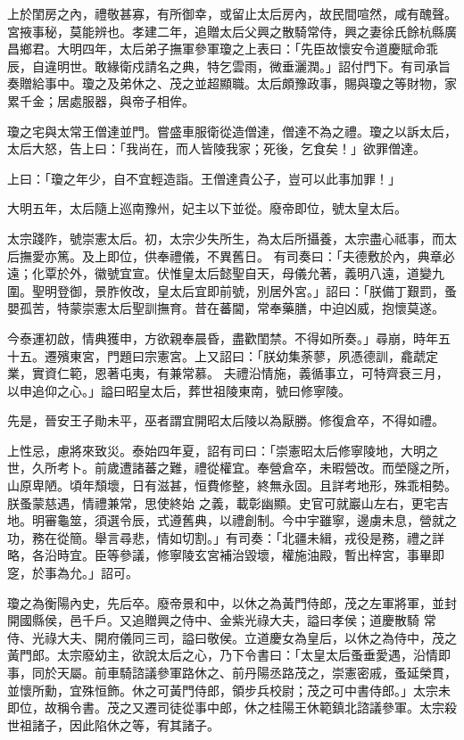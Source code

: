 \begin{pinyinscope}
 上於閨房之內，禮敬甚寡，有所御幸，或留止太后房內，故民間喧然，咸有醜聲。宮掖事秘，莫能辨也。孝建二年，追贈太后父興之散騎常侍，興之妻徐氏餘杭縣廣昌鄉君。大明四年，太后弟子撫軍參軍瓊之上表曰：「先臣故懷安令道慶賦命乖辰，自違明世。敢緣衛戍請名之典，特乞雲雨，微垂灑潤。」詔付門下。有司承旨奏贈給事中。瓊之及弟休之、茂之並超顯職。太后頗豫政事，賜與瓊之等財物，家
 累千金；居處服器，與帝子相侔。



 瓊之宅與太常王僧達並門。嘗盛車服衛從造僧達，僧達不為之禮。瓊之以訴太后，太后大怒，告上曰：「我尚在，而人皆陵我家；死後，乞食矣！」欲罪僧達。



 上曰：「瓊之年少，自不宜輕造詣。王僧達貴公子，豈可以此事加罪！」



 大明五年，太后隨上巡南豫州，妃主以下並從。廢帝即位，號太皇太后。



 太宗踐阼，號崇憲太后。初，太宗少失所生，為太后所攝養，太宗盡心祗事，而太后撫愛亦篤。及上即位，供奉禮儀，不異舊日。
 有司奏曰：「夫德敷於內，典章必遠；化覃於外，徽號宜宣。伏惟皇太后懿聖自天，母儀允著，義明八遠，道變九圍。聖明登御，景胙攸改，皇太后宜即前號，別居外宮。」詔曰：「朕備丁艱罰，蚤嬰孤苦，特蒙崇憲太后聖訓撫育。昔在蕃閫，常奉藥膳，中迫凶威，抱懷莫遂。



 今泰運初啟，情典獲申，方欲親奉晨昏，盡歡閨禁。不得如所奏。」尋崩，時年五十五。遷殯東宮，門題曰宗憲宮。上又詔曰：「朕幼集荼蓼，夙憑德訓，龕虣定業，實資仁範，恩著屯夷，有兼常慕。
 夫禮沿情施，義循事立，可特齊衰三月，以申追仰之心。」謚曰昭皇太后，葬世祖陵東南，號曰修寧陵。



 先是，晉安王子勛未平，巫者謂宜開昭太后陵以為厭勝。修復倉卒，不得如禮。



 上性忌，慮將來致災。泰始四年夏，詔有司曰：「崇憲昭太后修寧陵地，大明之世，久所考卜。前歲遭諸蕃之難，禮從權宜。奉營倉卒，未暇營改。而塋隧之所，山原卑陋。頃年頹壞，日有滋甚，恒費修整，終無永固。且詳考地形，殊乖相勢。朕蚤蒙慈遇，情禮兼常，思使終始
 之義，載彰幽顯。史官可就巖山左右，更宅吉地。明審龜筮，須選令辰，式遵舊典，以禮創制。今中宇雖寧，邊虜未息，營就之功，務在從簡。舉言尋悲，情如切割。」有司奏：「北疆未緝，戎役是務，禮之詳略，各沿時宜。臣等參議，修寧陵玄宮補治毀壞，權施油殿，暫出梓宮，事畢即窆，於事為允。」詔可。



 瓊之為衡陽內史，先后卒。廢帝景和中，以休之為黃門侍郎，茂之左軍將軍，並封開國縣侯，邑千戶。又追贈興之侍中、金紫光祿大夫，謚曰孝侯；道慶散騎
 常侍、光祿大夫、開府儀同三司，謚曰敬侯。立道慶女為皇后，以休之為侍中，茂之黃門郎。太宗廢幼主，欲說太后之心，乃下令書曰：「太皇太后蚤垂愛遇，沿情即事，同於天屬。前車騎諮議參軍路休之、前丹陽丞路茂之，崇憲密戚，蚤延榮貫，並懷所勳，宜殊恒飾。休之可黃門侍郎，領步兵校尉；茂之可中書侍郎。」太宗未即位，故稱令書。茂之又遷司徒從事中郎，休之桂陽王休範鎮北諮議參軍。太宗殺世祖諸子，因此陷休之等，宥其諸子。




\end{pinyinscope}
